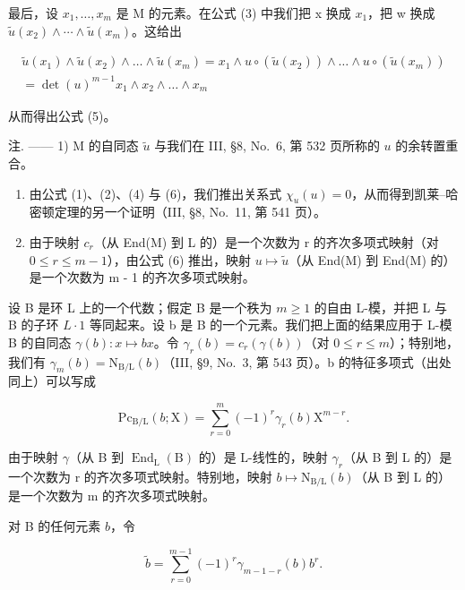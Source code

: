 最后，设 \(x_{1},\ldots,x_{m}\) 是 M 的元素。在公式 (3) 中我们把 x 换成 \(x_{1}\)，把 w 换成 \(\widetilde{u}(x_{2})\wedge\cdots\wedge\widetilde{u}(x_{m})\)。这给出

\[
\begin{array}{c} \widetilde {u} (x _ {1}) \wedge \widetilde {u} (x _ {2}) \wedge \dots \wedge \widetilde {u} (x _ {m}) = x _ {1} \wedge u \circ (\widetilde {u} (x _ {2})) \wedge \dots \wedge u \circ (\widetilde {u} (x _ {m})) \\ = \det (u) ^ {m - 1} x _ {1} \wedge x _ {2} \wedge \dots \wedge x _ {m} \end{array}
\]

从而得出公式 (5)。

注. —— 1) M 的自同态 \(\widetilde{u}\) 与我们在 III, §8, No.~6, 第 532 页所称的 \(u\) 的余转置重合。

\begin{enumerate}
\def\labelenumi{\arabic{enumi})}
\setcounter{enumi}{1}
\item
  由公式 (1)、(2)、(4) 与 (6)，我们推出关系式 \(\chi_u(u) = 0\)，从而得到凯莱–哈密顿定理的另一个证明（III, §8, No.~11, 第 541 页）。
\item
  由于映射 \(c_{r}\)（从 End(M) 到 L 的）是一个次数为 r 的齐次多项式映射（对 \(0 \leqslant r \leqslant m - 1\)），由公式 (6) 推出，映射 \(u \mapsto \widetilde{u}\)（从 End(M) 到 End(M) 的）是一个次数为 m - 1 的齐次多项式映射。
\end{enumerate}

设 B 是环 L 上的一个代数；假定 B 是一个秩为 \(m \geqslant 1\) 的自由 L-模，并把 L 与 B 的子环 \(L \cdot 1\) 等同起来。设 b 是 B 的一个元素。我们把上面的结果应用于 L-模 B 的自同态 \(\gamma(b) : x \mapsto bx\)。令 \(\gamma_{r}(b) = c_{r}(\gamma(b))\)（对 \(0 \leqslant r \leqslant m\)）；特别地，我们有 \(\gamma_{m}(b) = \mathrm{N}_{\mathrm{B/L}}(b)\)（III, §9, No.~3, 第 543 页）。b 的特征多项式（出处同上）可以写成

\[
\mathrm{Pc} _ {\mathrm{B/L}} (b; \mathrm{X}) = \sum_ {r = 0} ^ {m} (- 1) ^ {r} \gamma_ {r} (b) \mathrm{X} ^ {m - r}.\tag{16}
\]

由于映射 \(\gamma\)（从 B 到 \(\operatorname{End}_{\mathrm{L}}(\mathrm{B})\) 的）是 L-线性的，映射 \(\gamma_{r}\)（从 B 到 L 的）是一个次数为 r 的齐次多项式映射。特别地，映射 \(b \mapsto \mathrm{N}_{\mathrm{B}/\mathrm{L}}(b)\)（从 B 到 L 的）是一个次数为 m 的齐次多项式映射。

对 B 的任何元素 \(b\)，令

\[
\widetilde {b} = \sum_ {r = 0} ^ {m - 1} (- 1) ^ {r} \gamma_ {m - 1 - r} (b) b ^ {r}.\tag{17}
\]


